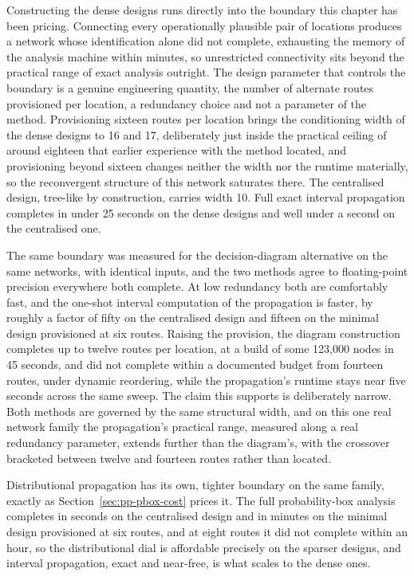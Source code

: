 \documentclass[12pt]{report}
\begin{document}
Constructing the dense designs runs directly into the boundary this chapter has been pricing. Connecting every operationally plausible pair of locations produces a network whose identification alone did not complete, exhausting the memory of the analysis machine within minutes, so unrestricted connectivity sits beyond the practical range of exact analysis outright. The design parameter that controls the boundary is a genuine engineering quantity, the number of alternate routes provisioned per location, a redundancy choice and not a parameter of the method. Provisioning sixteen routes per location brings the conditioning width of the dense designs to 16 and 17, deliberately just inside the practical ceiling of around eighteen that earlier experience with the method located, and provisioning beyond sixteen changes neither the width nor the runtime materially, so the reconvergent structure of this network saturates there. The centralised design, tree-like by construction, carries width 10. Full exact interval propagation completes in under 25 seconds on the dense designs and well under a second on the centralised one.

The same boundary was measured for the decision-diagram alternative on the same networks, with identical inputs, and the two methods agree to floating-point precision everywhere both complete. At low redundancy both are comfortably fast, and the one-shot interval computation of the propagation is faster, by roughly a factor of fifty on the centralised design and fifteen on the minimal design provisioned at six routes. Raising the provision, the diagram construction completes up to twelve routes per location, at a build of some 123{,}000 nodes in 45 seconds, and did not complete within a documented budget from fourteen routes, under dynamic reordering, while the propagation's runtime stays near five seconds across the same sweep. The claim this supports is deliberately narrow. Both methods are governed by the same structural width, and on this one real network family the propagation's practical range, measured along a real redundancy parameter, extends further than the diagram's, with the crossover bracketed between twelve and fourteen routes rather than located.

Distributional propagation has its own, tighter boundary on the same family, exactly as Section~\ref{sec:pp-pbox-cost} prices it. The full probability-box analysis completes in seconds on the centralised design and in minutes on the minimal design provisioned at six routes, and at eight routes it did not complete within an hour, so the distributional dial is affordable precisely on the sparser designs, and interval propagation, exact and near-free, is what scales to the dense ones.
\end{document}

